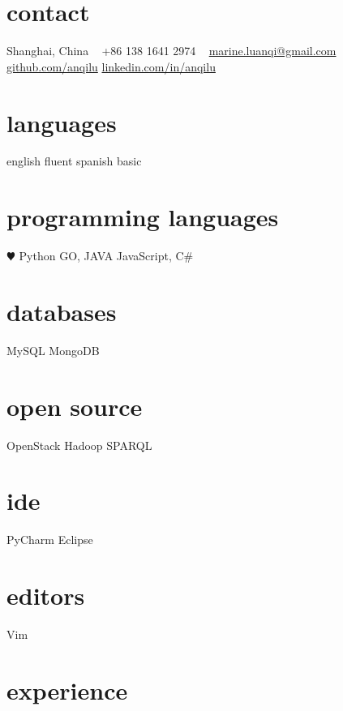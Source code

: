 \documentclass[]{friggeri-cv} %
\begin{document}


\begin{aside} %
\section{contact}
Shanghai, China
~
+86 138 1641 2974
~
\href{mailto:marine.luanqi@gmail.com}{marine.luanqi@gmail.com}
~
\href{https://github.com/anqilu}{github.com/anqilu}
\href{https://www.linkedin.com/in/anqilu}{linkedin.com/in/anqilu}
\section{languages}
english fluent
spanish basic
\section{programming languages}
{\color{red} $\varheartsuit$} Python
GO, JAVA
JavaScript, C\#
\section{databases}
MySQL
MongoDB
\section{open source}
OpenStack
Hadoop
SPARQL
\section{ide}
PyCharm
Eclipse
\section{editors}
Vim
\end{aside}

\section{experience}
\end{document}
